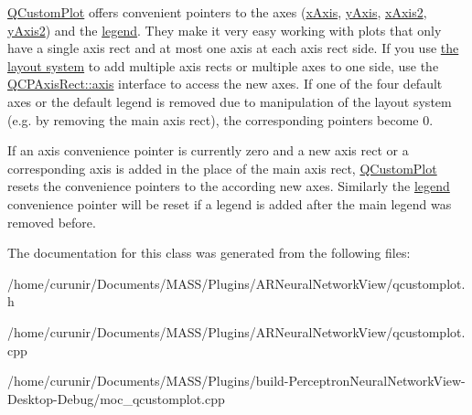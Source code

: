 \hyperlink{class_q_custom_plot}{Q\+Custom\+Plot} offers convenient pointers to the axes (\hyperlink{class_q_custom_plot_a9a79cd0158a4c7f30cbc702f0fd800e4}{x\+Axis}, \hyperlink{class_q_custom_plot_af6fea5679725b152c14facd920b19367}{y\+Axis}, \hyperlink{class_q_custom_plot_ada41599f22cad901c030f3dcbdd82fd9}{x\+Axis2}, \hyperlink{class_q_custom_plot_af13fdc5bce7d0fabd640f13ba805c0b7}{y\+Axis2}) and the \hyperlink{class_q_custom_plot_a4eadcd237dc6a09938b68b16877fa6af}{legend}. They make it very easy working with plots that only have a single axis rect and at most one axis at each axis rect side. If you use \hyperlink{}{the layout system} to add multiple axis rects or multiple axes to one side, use the \hyperlink{class_q_c_p_axis_rect_a560de44e47a4af0f86c59102a094b1e4}{Q\+C\+P\+Axis\+Rect\+::axis} interface to access the new axes. If one of the four default axes or the default legend is removed due to manipulation of the layout system (e.\+g. by removing the main axis rect), the corresponding pointers become 0.

If an axis convenience pointer is currently zero and a new axis rect or a corresponding axis is added in the place of the main axis rect, \hyperlink{class_q_custom_plot}{Q\+Custom\+Plot} resets the convenience pointers to the according new axes. Similarly the \hyperlink{class_q_custom_plot_a4eadcd237dc6a09938b68b16877fa6af}{legend} convenience pointer will be reset if a legend is added after the main legend was removed before. 

The documentation for this class was generated from the following files\+:\begin{DoxyCompactItemize}
\item 
/home/curunir/\+Documents/\+M\+A\+S\+S/\+Plugins/\+A\+R\+Neural\+Network\+View/qcustomplot.\+h\item 
/home/curunir/\+Documents/\+M\+A\+S\+S/\+Plugins/\+A\+R\+Neural\+Network\+View/qcustomplot.\+cpp\item 
/home/curunir/\+Documents/\+M\+A\+S\+S/\+Plugins/build-\/\+Perceptron\+Neural\+Network\+View-\/\+Desktop-\/\+Debug/moc\+\_\+qcustomplot.\+cpp\end{DoxyCompactItemize}
